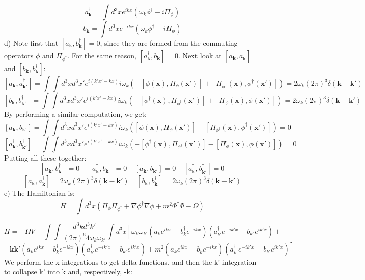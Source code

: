 \documentclass[12 pt]{article}
\begin{document}
\[  a^{\dagger}_{\mathbf{k}} =  \int d^3 x e^{ikx} \left(  \omega_k \phi^{\dagger} - i \Pi_{\phi}  \right)   \]
\[  b_{\mathbf{k}} =  \int d^3 x e^{-ikx} \left(  \omega_k \phi^{\dagger} + i \Pi_{\phi}  \right)  \]
d) Note first that $[a_{\mathbf{k}},b^{\dagger}_{\mathbf{k}}]=0$, since they are formed from the commuting operators $\phi$ and $\Pi_{\phi^{\dagger}}$. For the same reason, $[a^{\dagger}_{\mathbf{k}},b_{\mathbf{k}}]=0$. Next look at $[a_{\mathbf{k}},a^{\dagger}_{\mathbf{k}}]$ and $[b_{\mathbf{k}},b^{\dagger}_{\mathbf{k}}]$:
\[  [a_{\mathbf{k}},a^{\dagger}_{\mathbf{k'}}] = \int\int d^3 x d^3 x' e^{i(k'x'-kx)} i\omega_k \left(  - [\phi(\mathbf{x}), \Pi_{\phi}(\mathbf{x'})] + [\Pi_{\phi^{\dagger}}(\mathbf{x}), \phi^{\dagger}(\mathbf{x'}) ]  \right)  = 2\omega_{k} (2\pi)^3 \delta(\mathbf{k}-\mathbf{k'})  \]
\[  [b_{\mathbf{k}},b^{\dagger}_{\mathbf{k'}}] = \int\int d^3 x d^3 x' e^{i(k'x'-kx)} i\omega_k \left(  - [\phi^{\dagger}(\mathbf{x}), \Pi_{\phi^{\dagger}}(\mathbf{x'})] + [\Pi_{\phi}(\mathbf{x}), \phi(\mathbf{x'}) ]  \right) = 2\omega_{k} (2\pi)^3 \delta(\mathbf{k}-\mathbf{k'})   \]
By performing a similar computation, we get:
\[  [a_{\mathbf{k}},b_{\mathbf{k'}}] = \int\int d^3 x d^3 x' e^{i(k'x'-kx)} i\omega_k \left(  [\phi(\mathbf{x}), \Pi_{\phi}(\mathbf{x'})] + [\Pi_{\phi^{\dagger}}(\mathbf{x}), \phi^{\dagger}(\mathbf{x'}) ]  \right)  = 0  \]
\[  [a^{\dagger}_{\mathbf{k}},b^{\dagger}_{\mathbf{k'}}] = \int\int d^3 x d^3 x' e^{i(k'x'-kx)} i\omega_k \left(  - [\phi^{\dagger}(\mathbf{x}), \Pi_{\phi^{\dagger}}(\mathbf{x'})] - [\Pi_{\phi}(\mathbf{x}), \phi(\mathbf{x'}) ]  \right) =0   \]
Putting all these together:
\[  [a_{\mathbf{k}},b^{\dagger}_{\mathbf{k}}]=0  \;\;\;\;   [a^{\dagger}_{\mathbf{k}},b_{\mathbf{k}}]=0  \;\;\;\;  [a_{\mathbf{k}},b_{\mathbf{k'}}] = 0   \;\;\;\;  [a^{\dagger}_{\mathbf{k}},b^{\dagger}_{\mathbf{k'}}] = 0 \] 
\[ [a_{\mathbf{k}},a^{\dagger}_{\mathbf{k}}] = 2\omega_{k} (2\pi)^3 \delta(\mathbf{k}-\mathbf{k'}) \;\;\;\; [b_{\mathbf{k}},b^{\dagger}_{\mathbf{k}}] = 2\omega_{k} (2\pi)^3 \delta(\mathbf{k}-\mathbf{k'})  \]
e) The Hamiltonian is:
\[  H = \int d^3 x \left( \Pi_{\phi} \Pi_{\phi^{\dagger}} + \nabla \phi^{\dagger} \nabla \phi  + m^2 \Phi^{\dagger} \Phi - \Omega \right) \]

\[  H = - \Omega V + \int \int \frac{d^3 k d^3 k'}{(2\pi)^6 4\omega_k \omega_{k'}} \int d^3 x \left[  \omega_k \omega_{k'} ( a_k e^{ikx} - b^{\dagger}_k e^{-ikx} )(a^{\dagger}_{k'} e^{-ik'x} - b_{k'} e^{ik'x} )  +  \right.  \]
\[ + \left. \mathbf{k}\mathbf{k'}  ( a_k e^{ikx} - b^{\dagger}_k e^{-ikx} )(a^{\dagger}_{k'} e^{-ik'x} - b_{k'} e^{ik'x} )  + m^2  ( a_k e^{ikx} + b^{\dagger}_k e^{-ikx} )(a^{\dagger}_{k'} e^{-ik'x} + b_{k'} e^{ik'x} ) \right] \]
We perform the x integrations to get delta functions, and then the k' integration to collapse k' into k and, respectively, -k:
\end{document}
